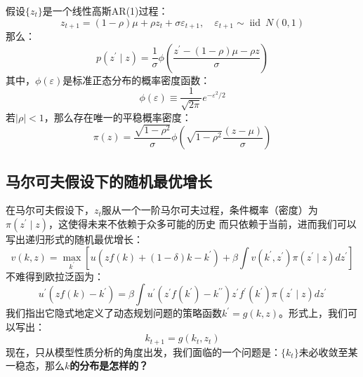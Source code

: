 \begin{example}
    假设$\{z_t\}$是一个线性高斯AR(1)过程：
    \begin{equation*}
        z_{t+1}=(1-\rho) \mu+\rho z_t+\sigma \varepsilon_{t+1}, \quad 
            \varepsilon_{t+1} \sim \operatorname{iid} ~ N(0,1)
    \end{equation*}
    那么：
    \begin{equation*}
        p\left(z^{\prime} \mid z\right)=\frac{1}{\sigma} \phi\left(\frac{z^{\prime}-(1-\rho) \mu-\rho z}{\sigma}\right)
    \end{equation*}
    其中，$\phi(\varepsilon)$是标准正态分布的概率密度函数：
    \begin{equation*}
        \phi(\varepsilon) \equiv \frac{1}{\sqrt{2 \pi}} e^{-\varepsilon^2 / 2}
    \end{equation*}
    若$\left|\rho\right|<1$，那么存在唯一的平稳概率密度：
    \begin{equation*}
        \pi(z) = \frac{\sqrt{1-\rho^2}}{\sigma} \phi\left(\sqrt{1-\rho^2}\frac{(z-\mu)}{\sigma}\right)
    \end{equation*}
\end{example}


\subsection{马尔可夫假设下的随机最优增长}

在马尔可夫假设下，$z_t$服从一个一阶马尔可夫过程，条件概率（密度）为$\pi(z^{\prime}\mid z)$，这使得未来不依赖于众多可能的历史
而只依赖于当前，进而我们可以写出递归形式的随机最优增长：
\begin{equation*}
    v(k, z)=\max _{k^{\prime}}
        \left[u\left(zf(k)+(1-\delta)k-k^{\prime}\right)
        +\beta \int v\left(k^{\prime}, z^{\prime}\right) \pi\left(z^{\prime} \mid z\right) d z^{\prime}\right]
\end{equation*}
不难得到欧拉泛函为：
\begin{equation*}
    u^{\prime}\left(z f(k)-k^{\prime}\right)=
        \beta \int u^{\prime}\left(z^{\prime} f\left(k^{\prime}\right) - 
            k^{\prime \prime}\right) z^{\prime} f^{\prime}\left(k^{\prime}\right) 
                \pi\left(z^{\prime} \mid z\right) d z^{\prime}
\end{equation*}
我们指出它隐式地定义了动态规划问题的策略函数$k^{\prime}=g(k,z)$。形式上，我们可以写出：
\begin{equation*}
    k_{t+1} = g(k_t,z_t)
\end{equation*}
现在，只从模型性质分析的角度出发，我们面临的一个问题是：$\{k_t\}$未必收敛至某一稳态，那么\textbf{$k$的分布是怎样的？}

